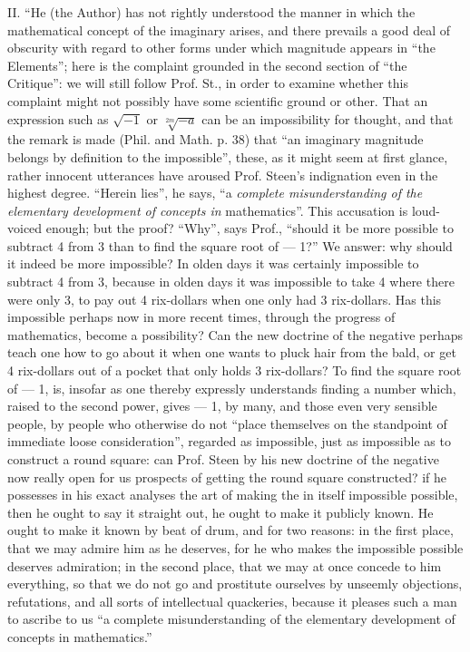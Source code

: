 \documentclass[12pt,a4paper,openany]{book}
\newcommand{\opage}[1]{\marginnote{\footnotesize\textit{[#1]}}}
\begin{document}
II. ``He (the Author) has not rightly understood the manner
in which the mathematical concept of the imaginary arises, and
there prevails a good deal of obscurity with regard to other forms
under which magnitude appears in ``the Elements''; here is the complaint
grounded in the second section of ``the Critique'': we will
\opage{22}\setcounter{footnote}{0}%
still follow Prof. St., in order to examine whether this
complaint might not possibly have some scientific ground or other. That an expression such as $\sqrt{-1}$ or $\sqrt[2m]{-a}$ can
be an impossibility for thought, and that the remark is made (Phil. and Math.
p. 38) that ``an imaginary magnitude
belongs by definition to the impossible'', these, as it
might seem at first glance, rather innocent utterances
have aroused Prof. Steen's indignation even in the highest degree.
``Herein lies'', he says, ``a \emph{complete misunderstanding of the elementary development of concepts in}
mathematics''. This accusation is loud-voiced enough;
but the proof? ``Why'', says Prof., ``should it be
more possible to subtract 4 from 3 than to find the square root
of --- 1?'' We answer: why should it indeed be more impossible? In olden days it was certainly impossible to subtract
4 from 3, because in olden days it was impossible to take 4
where there were only 3, to pay out 4 rix-dollars when one only
had 3 rix-dollars. Has this impossible perhaps now in more recent
times, through the progress of mathematics, become a possibility?
Can the new doctrine of the negative perhaps teach one how
to go about it when one wants to pluck hair from the
bald, or get 4 rix-dollars out of a pocket that only
holds 3 rix-dollars? To find the square root of --- 1, is,
insofar as one thereby expressly understands finding a number
which, raised to the second power, gives --- 1, by many, and
those even very sensible people, by people who otherwise do not
``place themselves on the standpoint of immediate loose consideration'', regarded as impossible, just as impossible as to construct
a round square: can Prof. Steen by his new doctrine
of the negative now really open for us prospects of getting
the round square constructed? if he possesses in his exact
analyses the art of making the in itself impossible possible, then
he ought to say it straight out, he ought to make it publicly
known. He ought to make it known by beat of drum,
\opage{23}\setcounter{footnote}{0}%
and for two reasons: in the first place, that we may admire
him as he deserves, for he who makes the impossible
possible deserves admiration; in the second place, that we may at once
concede to him everything, so that we do not go and prostitute
ourselves by unseemly objections, refutations, and all sorts of
intellectual quackeries, because it pleases such a man
to ascribe to us ``a complete misunderstanding of the
elementary development of concepts in mathematics.''
\end{document}
